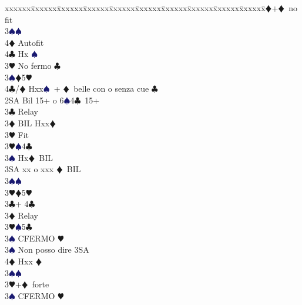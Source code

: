\documentclass[a4paper,italian]{article}
\newcommand{\BC}{\textcolor{OliveGreen}{$\clubsuit$}}
\newcommand{\BD}{\textcolor{RedOrange}{$\vardiamondsuit$}}
\newcommand{\BH}{\textcolor{Red2}{$\varheartsuit${}}}
\newcommand{\BS}{\textcolor{MidnightBlue}{$\spadesuit${}}}
\newenvironment{bidtable}
{\begin{tabbing}

    xxxxxx\=xxxxxx\=xxxxxx\=xxxxxx\=xxxxxx\=xxxxxx\=xxxxxx\=xxxxxx\=xxxxxx\=xxxxxx\=\kill}
{\end{tabbing} }%
\begin{document}
\begin{multicols}{2}
\begin{bidtable}
                                            3\BD {}+\BD\ no fit\+\\
                                            3\BS {}\BS \+\\
                                            4\BD \> Autofit\\
                                            4\BC \> Hx \BS \-\-\\
                                            3\BH \> No fermo \BC \\
                                            3\BS {}\BD 5\BH \\
                                            4\BC/\BD \> Hxx\BS\ + \BD\ belle con o senza cue \BC\-\\
                                            2SA \> Bil 15+ o 6\BS 4\BC\ 15+\+\\
                                            3\BC \> Relay\+\\
                                            3\BD \> BIL Hxx\BD \+\\
                                            3\BH \> Fit\-\\
                                            3\BH {}\BS 4\BC \\
                                            3\BS \> Hx\BD\ BIL\\
                                            3SA \> xx o xxx \BD\ BIL\-\\
                                            3\BS {}\BS \\
                                            3\BH {}\BD 5\BH\-\\
                                            3\BC {}+ 4\BC \+\\
                                            3\BD \> Relay\+\\
                                            3\BH {}\BS 5\BC \+\\
                                            3\BS \> CFERMO \BH\-\\
                                            3\BS \> Non posso dire 3SA\\
                                            4\BD \> Hxx \BD \-\\
                                            3\BS {}\BS \\
                                            3\BH {}+\BD\ forte\+\\
                                            3\BS\> CFERMO \BH\\

\end{bidtable}
\end{multicols}
\end{document}
